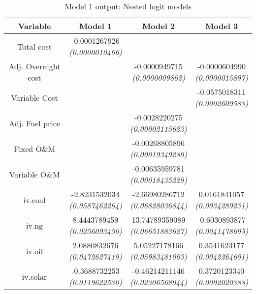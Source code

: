 \documentclass[10pt]{amsart}
\begin{document}
\begin{table}[H]
\caption{Model 1 output: Nested logit models}
\centering
\begin{tabular}{c c c c}
\hline
\hline
Variable & Model 1 & Model 2 & Model 3\\ [0.5ex]
\hline
Total cost & \makecell{-0.0001267926 \\ {\footnotesize\textit{(0.0000010466)}}} & & \\
Adj. Overnight cost & & \makecell{-0.0000949715 \\ {\footnotesize\textit{(0.0000009862)}}} & \makecell{-0.0000604990 \\ {\footnotesize\textit{(0.0000015897)}}} \\
Variable Cost & & & \makecell{-0.0575018311 \\ {\footnotesize\textit{(0.0002609583)}}} \\
Adj. Fuel price & & \makecell{-0.0028220275 \\ {\footnotesize\textit{(0.00002115623)}}} & \\
Fixed O\&M & & \makecell{-0.00268805896 \\ {\footnotesize\textit{(0.00019349289)}}} &\\
Variable O\&M & & \makecell{-0.00635959781 \\ {\footnotesize\textit{(0.00018435229)}}} &\\
iv.coal & \makecell{-2.8231532034 \\ {\footnotesize\textit{(0.0587462264)}}} & \makecell{-2.66980286712 \\ {\footnotesize\textit{(0.06828036844)}}} & \makecell{0.0161841057 \\ {\footnotesize\textit{(0.0034289231)}}} \\
iv.ng & \makecell{8.4443789459 \\ {\footnotesize\textit{(0.0256093450)}}} & \makecell{13.74789359089 \\ {\footnotesize\textit{(0.06651883627)}}} & \makecell{-0.6030893877 \\ {\footnotesize\textit{(0.0041478695)}}} \\
iv.oil & \makecell{2.0880832676 \\ {\footnotesize\textit{(0.0472627419)}}} & \makecell{5.05227178166 \\ {\footnotesize\textit{(0.05983481003)}}} & \makecell{0.3541623177 \\ {\footnotesize\textit{(0.0042264601)}}} \\
iv.solar & \makecell{-0.3688732253 \\ {\footnotesize\textit{(0.0119622530)}}} & \makecell{-0.46214211146 \\ {\footnotesize\textit{(0.02306568944)}}} & \makecell{0.3720123340 \\ {\footnotesize\textit{(0.0092020388)}}} \\

\end{tabular}
\end{table}
\end{document}
